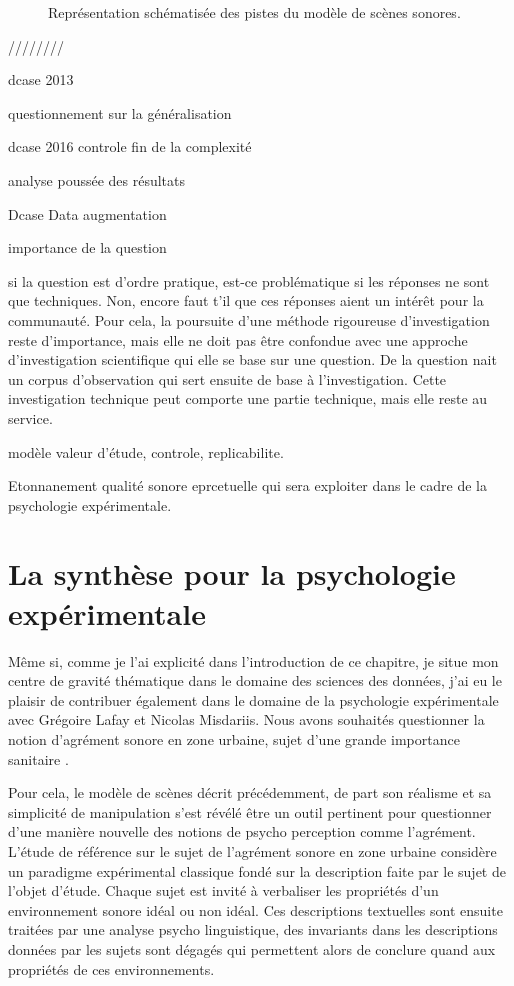 \begin{figure}[t]
        \graphicspath{{figures/}}
        \def\svgwidth{\linewidth}
        
       \caption{Représentation schématisée des pistes du modèle de scènes sonores.}\label{fig:modelSequence}
\end{figure}

////////

dcase 2013 \cite{stowellhal-01253912}

questionnement sur la généralisation \cite{lafayhal-01111381}

dcase 2016 controle fin de la complexité

analyse poussée des résultats \cite{lafayhal-01635414}

Dcase  \cite{mesa} Data augmentation

importance de la question

si la question est d'ordre pratique, est-ce problématique si les réponses ne sont que techniques. Non, encore faut t'il que ces réponses aient un intérêt pour la communauté. Pour cela, la poursuite d'une méthode rigoureuse d'investigation reste d'importance, mais elle ne doit pas être confondue avec une approche d'investigation scientifique qui elle se base sur une question. De la question nait un corpus d'observation qui sert ensuite de base à l'investigation. Cette investigation technique peut comporte une partie technique, mais elle reste au service.

modèle valeur d'étude, controle, replicabilite.

Etonnanement qualité sonore eprcetuelle qui sera exploiter dans le cadre de la psychologie expérimentale.

\section{La synthèse pour la psychologie expérimentale}

Même si, comme je l'ai explicité dans l'introduction de ce chapitre, je situe mon centre de gravité thématique dans le domaine des sciences des données, j'ai eu le plaisir de contribuer également dans le domaine de la psychologie expérimentale avec Grégoire Lafay et Nicolas Misdariis. Nous avons souhaités questionner la notion d'agrément sonore en zone urbaine, sujet d'une grande importance sanitaire \cite{europe}.

Pour cela, le modèle de scènes décrit précédemment, de part son réalisme et sa simplicité de manipulation s'est révélé être un outil pertinent pour questionner d'une manière nouvelle des notions de psycho perception comme l'agrément. L'étude de référence sur le sujet de l'agrément sonore en zone urbaine \cite{guastavino} considère un paradigme expérimental classique fondé sur la description faite par le sujet de l'objet d'étude. Chaque sujet est invité à verbaliser les propriétés d'un environnement sonore idéal ou non idéal. Ces descriptions textuelles sont ensuite traitées par une analyse psycho linguistique, des invariants dans les descriptions données par les sujets sont dégagés qui permettent alors de conclure quand aux propriétés de ces environnements.

